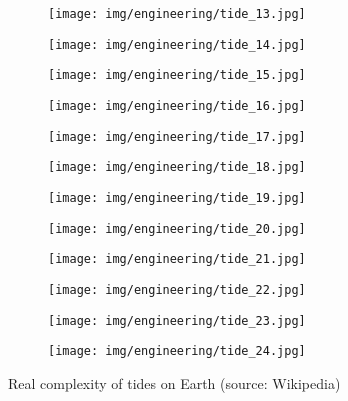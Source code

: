 	\begin{figure}[H]
		\centering
		\begin{subfigure}{.4\textwidth}
		  \centering
		  \texttt{[image: img/engineering/tide\_13.jpg]}
		\end{subfigure}
		\begin{subfigure}{.4\textwidth}
		  \centering
		  \texttt{[image: img/engineering/tide\_14.jpg]}
		\end{subfigure}
		\begin{subfigure}{.4\textwidth}
		  \centering
		  \texttt{[image: img/engineering/tide\_15.jpg]}
		\end{subfigure}
		\begin{subfigure}{.4\textwidth}
		  \centering
		  \texttt{[image: img/engineering/tide\_16.jpg]}
		\end{subfigure}
		\begin{subfigure}{.4\textwidth}
		  \centering
		  \texttt{[image: img/engineering/tide\_17.jpg]}
		\end{subfigure}
		\begin{subfigure}{.4\textwidth}
		  \centering
		  \texttt{[image: img/engineering/tide\_18.jpg]}
		\end{subfigure}
		\begin{subfigure}{.4\textwidth}
		  \centering
		  \texttt{[image: img/engineering/tide\_19.jpg]}
		\end{subfigure}
		\begin{subfigure}{.4\textwidth}
		  \centering
		  \texttt{[image: img/engineering/tide\_20.jpg]}
		\end{subfigure}
		\begin{subfigure}{.4\textwidth}
		  \centering
		  \texttt{[image: img/engineering/tide\_21.jpg]}
		\end{subfigure}
		\begin{subfigure}{.4\textwidth}
		  \centering
		  \texttt{[image: img/engineering/tide\_22.jpg]}
		\end{subfigure}
		\begin{subfigure}{.4\textwidth}
		  \centering
		  \texttt{[image: img/engineering/tide\_23.jpg]}
		\end{subfigure}
		\begin{subfigure}{.4\textwidth}
		  \centering
		  \texttt{[image: img/engineering/tide\_24.jpg]}
		\end{subfigure}
		\caption{Real complexity of tides on Earth (source: Wikipedia)}
	\end{figure}
